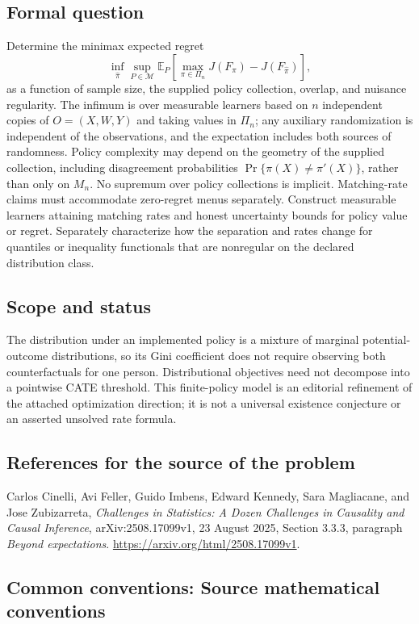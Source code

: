 \documentclass[11pt,a4paper]{article}
\newcommand{\E}{\mathbb E}
\begin{document}
\subsection*{Formal question}
Determine the minimax expected regret
\[
\inf_{\widehat\pi}\sup_{P\in\mathcal M}
\E_P\!\left[\max_{\pi\in\Pi_n}J(F_\pi)
                 -J(F_{\widehat\pi})\right],
\]
as a function of sample size, the supplied policy collection, overlap, and nuisance regularity. The infimum is over measurable learners based on $n$ independent copies of $O=(X,W,Y)$ and taking values in $\Pi_n$; any auxiliary randomization is independent of the observations, and the expectation includes both sources of randomness. Policy complexity may depend on the geometry of the supplied collection, including disagreement probabilities $\Pr\{\pi(X)\ne\pi'(X)\}$, rather than only on $M_n$. No supremum over policy collections is implicit. Matching-rate claims must accommodate zero-regret menus separately. Construct measurable learners attaining matching rates and honest uncertainty bounds for policy value or regret. Separately characterize how the separation and rates change for quantiles or inequality functionals that are nonregular on the declared distribution class.
\subsection*{Scope and status}
The distribution under an implemented policy is a mixture of marginal potential-outcome distributions, so its Gini coefficient does not require observing both counterfactuals for one person. Distributional objectives need not decompose into a pointwise CATE threshold. This finite-policy model is an editorial refinement of the attached optimization direction; it is not a universal existence conjecture or an asserted unsolved rate formula.
\subsection*{References for the source of the problem}
Carlos Cinelli, Avi Feller, Guido Imbens, Edward Kennedy, Sara Magliacane, and Jose Zubizarreta, \emph{Challenges in Statistics: A Dozen Challenges in Causality and Causal Inference}, arXiv:2508.17099v1, 23 August 2025, Section 3.3.3, paragraph \emph{Beyond expectations}. \url{https://arxiv.org/html/2508.17099v1}.

\subsection*{Common conventions: Source mathematical conventions}
\end{document}
